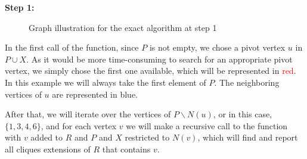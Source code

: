 \begin{minipage}{\linewidth}
    \textbf{Step 1:} \newline
    \begin{minipage}{0.4\textwidth}
        \begin{figure}[H]
            \centering
            \caption{Graph illustration for the exact algorithm at step 1}
            \label{fig:exact-mewc-step1}
        \end{figure}
    \end{minipage}
    \begin{minipage}{0.6\textwidth}
        In the first call of the function, since $P$ is not empty, we chose a
        pivot vertex $u$ in $P\cup X$. As it would be more time-consuming to
        search for an appropriate pivot vertex, we simply chose the first one
        available, which will be represented in \textcolor{red}{red}. In this
        example we will always take the first element of $P$. The neighboring
        vertices of $u$ are represented in \textcolor{Cerulean}{blue}. \newline

        After that, we will iterate over the vertices of $P\backslash N(u)$,
        or in this case, $\{1,3,4,6\}$, and for each vertex $v$ we will make a
        recursive call to the function with $v$ added to $R$ and $P$ and $X$
        restricted to $N(v)$, which will find and report all cliques extensions
        of $R$ that contains $v$. \newline
    \end{minipage}
\end{minipage} \newline

